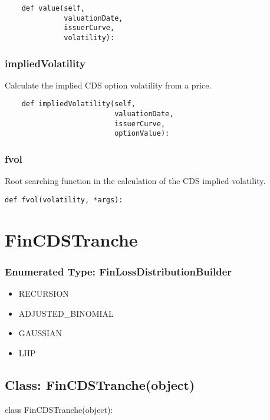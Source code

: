 \documentclass[twoside,11pt]{book}
\begin{document}
\begin{lstlisting}
    def value(self,
              valuationDate,
              issuerCurve,
              volatility):
\end{lstlisting}

\subsubsection*{{\bf impliedVolatility}}
Calculate the implied CDS option volatility from a price.  

\begin{lstlisting}
    def impliedVolatility(self,
                          valuationDate,
                          issuerCurve,
                          optionValue):
\end{lstlisting}

\subsubsection*{{\bf fvol}}
Root searching function in the calculation of the CDS implied volatility.  

\begin{lstlisting}
def fvol(volatility, *args):
\end{lstlisting}

\newpage
\section{FinCDSTranche}

\subsubsection{Enumerated Type: FinLossDistributionBuilder}
\begin{itemize}
\item{RECURSION}
\item{ADJUSTED\_BINOMIAL}
\item{GAUSSIAN}
\item{LHP}
\end{itemize}

\subsection*{Class: FinCDSTranche(object)}
class FinCDSTranche(object): 
\end{document}
